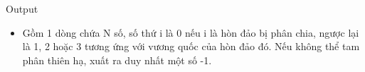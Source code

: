 Output
\begin{itemize}
	\item     Gồm 1 dòng chứa N số, số thứ i là 0 nếu i là hòn đảo bị phân chia, ngược lại là 1, 2 hoặc 3 tương ứng với vương quốc của hòn đảo đó. Nếu không thể tam phân thiên hạ, xuất ra duy nhất một số -1.   
\end{itemize}